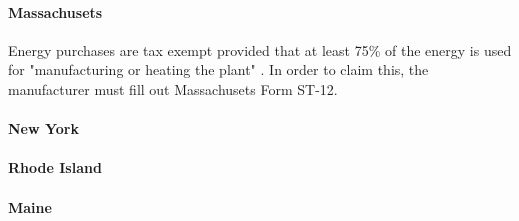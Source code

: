 \documentclass[12pt]{article}
\begin{document}
\paragraph{Massachusets}

Energy purchases are tax exempt provided that at least 75\% of the energy is used for "manufacturing or heating the plant" \cite{EversourceEnergyTaxExemption}. In order to claim this, the manufacturer must fill out Massachusets Form ST-12. 

\paragraph{New York}

\paragraph{Rhode Island}

\paragraph{Maine}
\end{document}
